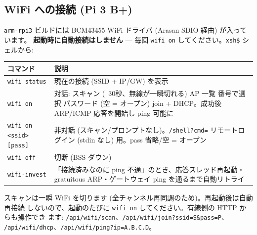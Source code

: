 \documentclass[a4paper,11pt]{ltjsarticle}
\begin{document}
\subsection{WiFi への接続 (Pi 3 B+)}
\verb|arm-rpi3| ビルドには BCM43455 WiFi ドライバ (Arasan SDIO 経由) が入っています。
\textbf{起動時に自動接続はしません} --- 毎回 \verb|wifi on| してください。\verb|xsh$|
シェルから:
\begin{center}\footnotesize
\begin{tabular}{@{}l p{9.0cm}@{}}
\toprule \textbf{コマンド} & \textbf{説明}\\ \midrule
\verb|wifi status| & 現在の接続 (SSID + IP/GW) を表示\\
\verb|wifi on| & 対話: スキャン (~30秒、無線が一瞬切れる) \textrightarrow{} AP 一覧 \textrightarrow{} 番号で選択 \textrightarrow{} パスワード (空 = オープン) \textrightarrow{} join + DHCP。成功後 ARP/ICMP 応答を開始し ping 可能に\\
\verb|wifi on <ssid> [pass]| & 非対話 (スキャン/プロンプトなし)。\verb|/shell?cmd=| リモートログイン (stdin なし) 用。pass 省略/空 = オープン\\
\verb|wifi off| & 切断 (BSS ダウン)\\
\verb|wifi-invest| & 「接続済みなのに ping 不通」のとき、応答スレッド再起動・gratuitous ARP・ゲートウェイ ping を通るまで自動リトライ\\
\bottomrule
\end{tabular}
\end{center}
スキャンは一瞬 WiFi を切ります (全チャンネル再同調のため)。再起動後は自動再接続
しないので、起動のたびに \verb|wifi on| してください。有線側の HTTP からも操作でき
ます: \verb|/api/wifi/scan|、\verb|/api/wifi/join?ssid=S&pass=P|、
\verb|/api/wifi/dhcp|、\verb|/api/wifi/ping?ip=A.B.C.D|。
\end{document}
